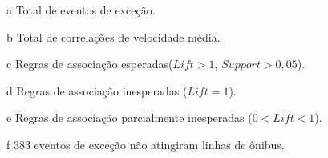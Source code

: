 \documentclass[
	12pt,				%
	oneside,			%
	a4paper,			%
	english,			%
	brazil				%
	]{abntex2ppgsi}
\begin{document}
{{\begin{apendicesenv}
\begin{table}[!htb]
\begin{threeparttable}
\begin{tablenotes}
            \item[a] Total de eventos de exceção.
            \item[b] Total de correlações de velocidade média.
            \item[c] Regras de associação esperadas($Lift > 1$, $Support > 0,05$).
            \item[d] Regras de associação inesperadas ($Lift = 1$).
            \item[e] Regras de associação parcialmente inesperadas ($0 < Lift < 1$).
            \item[f] 383 eventos de exceção não atingiram linhas de ônibus.
        \end{tablenotes}
\end{threeparttable}
\end{table}


\end{apendicesenv}}}
\end{document}
